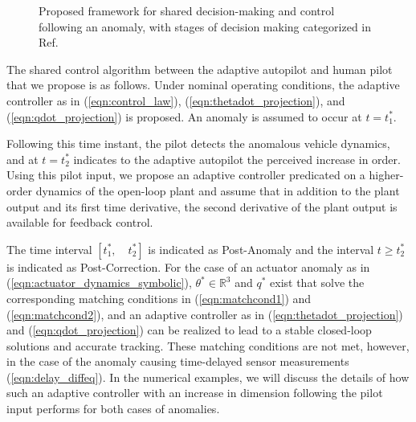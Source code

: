 \begin{figure}[h]

	\caption{Proposed framework for shared decision-making and control following an anomaly, with stages of decision making categorized in Ref.~\cite{parasuraman2000model}}
	\label{fig:response_flow}
\end{figure}

The shared control algorithm between the adaptive autopilot and human pilot that we propose is as follows. Under nominal operating conditions, the adaptive controller as in (\ref{eqn:control_law}), (\ref{eqn:thetadot_projection}), and (\ref{eqn:qdot_projection}) is proposed. An anomaly is assumed to occur at $t=t_1^*$. 

Following this time instant, the pilot detects the anomalous vehicle dynamics, and at $t=t_2^*$ indicates to the adaptive autopilot the perceived increase in order. Using this pilot input, we propose an adaptive controller predicated on a higher-order dynamics of the open-loop plant and assume that in addition to the plant output and its first time derivative, the second derivative of the plant output is available for feedback control. 

The time interval $[t_1^*, \quad t_2^*]$ is indicated as Post-Anomaly and the interval $t \geq t_2^*$ is indicated as Post-Correction. For the case of an actuator anomaly as in (\ref{eqn:actuator_dynamics_symbolic}), $\theta^* \in \mathbb{R}^3$ and $q^*$ exist that solve the corresponding matching conditions in (\ref{eqn:matchcond1}) and (\ref{eqn:matchcond2}), and an adaptive controller as in (\ref{eqn:thetadot_projection}) and (\ref{eqn:qdot_projection}) can be realized to lead to a stable closed-loop solutions and accurate tracking. These matching conditions are not met, however, in the case of the anomaly causing time-delayed sensor measurements (\ref{eqn:delay_diffeq}). In the numerical examples, we will discuss the details of how such an adaptive controller with an increase in dimension following the pilot input performs for both cases of anomalies. 

